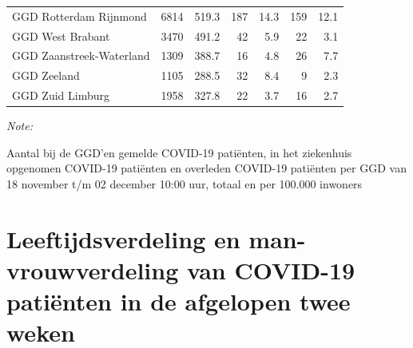 \documentclass[
  english,
  man,floatsintext]{apa6}
\begin{document}
\begin{table}[H]
\begin{threeparttable}
\begin{tabular}{lrrrrrr}
GGD Rotterdam Rijnmond & 6814 & 519.3 & 187 & 14.3 & 159 & 12.1\\
GGD West Brabant & 3470 & 491.2 & 42 & 5.9 & 22 & 3.1\\
GGD Zaanstreek-Waterland & 1309 & 388.7 & 16 & 4.8 & 26 & 7.7\\
GGD Zeeland & 1105 & 288.5 & 32 & 8.4 & 9 & 2.3\\
GGD Zuid Limburg & 1958 & 327.8 & 22 & 3.7 & 16 & 2.7\\
\bottomrule
\end{tabular}
\begin{tablenotes}
\item \textit{Note: } 
\item Aantal bij de GGD’en gemelde COVID-19 patiënten, in het ziekenhuis opgenomen COVID-19 patiënten en overleden COVID-19 patiënten per GGD van 18 november t/m 02 december 10:00 uur, totaal en per 100.000 inwoners
\end{tablenotes}
\end{threeparttable}
\endgroup{}
\end{table}

\newpage

\hypertarget{leeftijdsverdeling-en-man-vrouwverdeling-van-covid-19-patiuxebnten-in-de-afgelopen-twee-weken}{%
\section{Leeftijdsverdeling en man-vrouwverdeling van COVID-19 patiënten in de afgelopen twee weken}\label{leeftijdsverdeling-en-man-vrouwverdeling-van-covid-19-patiuxebnten-in-de-afgelopen-twee-weken}}
\end{document}
